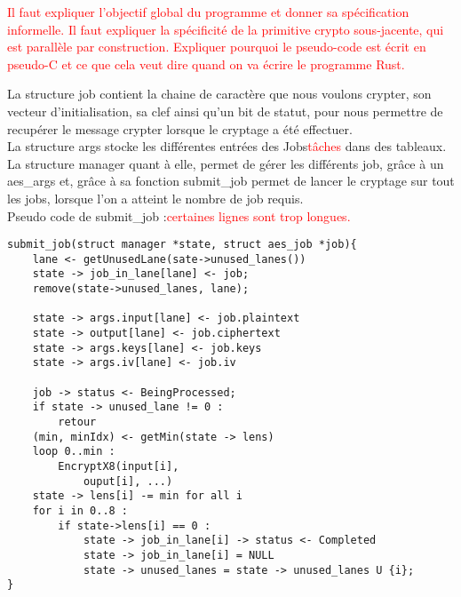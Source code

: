 \documentclass{article}
\newcommand{\TODO}[1]{\textcolor{red}{#1}}
\begin{document}
\TODO{Il faut expliquer l'objectif global du programme et donner sa spécification informelle.}
\TODO{Il faut expliquer la spécificité de la primitive crypto sous-jacente, qui est parallèle par construction.}
\TODO{Expliquer pourquoi le pseudo-code est écrit en pseudo-C et ce que cela veut dire quand on va écrire le programme Rust.}


La structure job contient la chaine de caractère que nous voulons crypter, son vecteur d'initialisation, sa clef ainsi qu'un bit de statut, pour nous permettre de recupérer le message crypter lorsque le cryptage a été effectuer.
\\
La structure args stocke les différentes entrées des Jobs\TODO{tâches} dans des tableaux.
\\
La structure manager quant à elle, permet de gérer les différents job, grâce à un aes\_args et, grâce à sa fonction submit\_job permet de lancer le cryptage sur tout les jobs, lorsque l'on a atteint le nombre de job requis.
\\
Pseudo code de submit\_job :\TODO{certaines lignes sont trop longues.}
\begin{lstlisting}
submit_job(struct manager *state, struct aes_job *job){
	lane <- getUnusedLane(sate->unused_lanes())
	state -> job_in_lane[lane] <- job;
	remove(state->unused_lanes, lane);

	state -> args.input[lane] <- job.plaintext
	state -> output[lane] <- job.ciphertext
	state -> args.keys[lane] <- job.keys
	state -> args.iv[lane] <- job.iv

	job -> status <- BeingProcessed;
	if state -> unused_lane != 0 :
		retour
	(min, minIdx) <- getMin(state -> lens) 
	loop 0..min :
		EncryptX8(input[i],
			ouput[i], ...)
	state -> lens[i] -= min for all i
	for i in 0..8 :
		if state->lens[i] == 0 :
			state -> job_in_lane[i] -> status <- Completed
			state -> job_in_lane[i] = NULL
			state -> unused_lanes = state -> unused_lanes U {i};
}
\end{lstlisting}
\end{document}
